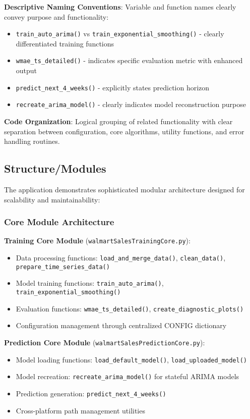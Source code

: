\textbf{Descriptive Naming Conventions}: Variable and function names clearly convey purpose and functionality:
\begin{itemize}
	\item \texttt{train\_auto\_arima()} vs \texttt{train\_exponential\_smoothing()} - clearly differentiated training functions
	\item \texttt{wmae\_ts\_detailed()} - indicates specific evaluation metric with enhanced output
	\item \texttt{predict\_next\_4\_weeks()} - explicitly states prediction horizon
	\item \texttt{recreate\_arima\_model()} - clearly indicates model reconstruction purpose
\end{itemize}

\textbf{Code Organization}: Logical grouping of related functionality with clear separation between configuration, core algorithms, utility functions, and error handling routines.

\subsection{Structure/Modules}

The application demonstrates sophisticated modular architecture designed for scalability and maintainability:

\subsubsection{Core Module Architecture}

\textbf{Training Core Module} (\texttt{walmartSalesTrainingCore.py}):
\begin{itemize}
	\item Data processing functions: \texttt{load\_and\_merge\_data()}, \texttt{clean\_data()}, \texttt{prepare\_time\_series\_data()}
	\item Model training functions: \texttt{train\_auto\_arima()}, \texttt{train\_exponential\_smoothing()}
	\item Evaluation functions: \texttt{wmae\_ts\_detailed()}, \texttt{create\_diagnostic\_plots()}
	\item Configuration management through centralized CONFIG dictionary
\end{itemize}

\textbf{Prediction Core Module} (\texttt{walmartSalesPredictionCore.py}):
\begin{itemize}
	\item Model loading functions: \texttt{load\_default\_model()}, \texttt{load\_uploaded\_model()}
	\item Model recreation: \texttt{recreate\_arima\_model()} for stateful ARIMA models
	\item Prediction generation: \texttt{predict\_next\_4\_weeks()}
	\item Cross-platform path management utilities
\end{itemize}

